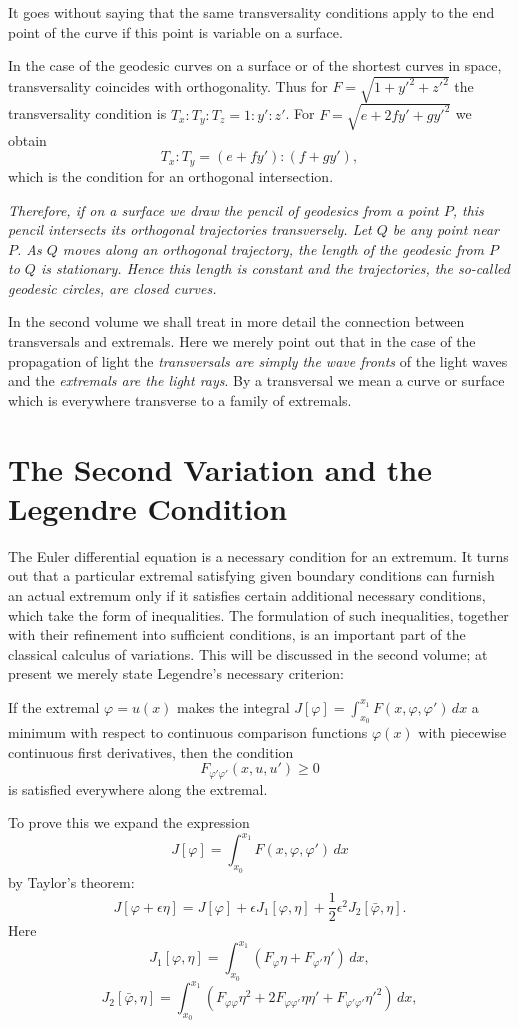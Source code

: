 It goes without saying that the same transversality conditions apply to the end point of the curve if this point is variable on a surface.

In the case of the geodesic curves on a surface or of the shortest curves in space, transversality coincides with orthogonality. Thus for $F=\sqrt{1+y'^2+z'^2}$ the transversality condition is $T_x:T_y:T_z=1:y':z'$. For $F=\sqrt{e+2fy'+gy'^2}$ we obtain
\[
T_x:T_y=(e+fy'):(f+gy'),
\]
which is the condition for an orthogonal intersection.

\emph{Therefore, if on a surface we draw the pencil of geodesics from a point $P$, this pencil intersects its orthogonal trajectories transversely. Let $Q$ be any point near $P$. As $Q$ moves along an orthogonal trajectory, the length of the geodesic from $P$ to $Q$ is stationary. Hence this length is constant and the trajectories, the so-called geodesic circles, are closed curves.}

In the second volume we shall treat in more detail the connection between transversals and extremals. Here we merely point out that in the case of the propagation of light the \emph{transversals are simply the wave fronts} of the light waves and the \emph{extremals are the light rays}. By a transversal we mean a curve or surface which is everywhere transverse to a family of extremals.

\section{The Second Variation and the Legendre Condition}
The Euler differential equation is a necessary condition for an extremum. It turns out that a particular extremal satisfying given boundary conditions can furnish an actual extremum only if it satisfies certain additional necessary conditions, which take the form of inequalities. The formulation of such inequalities, together with their refinement into sufficient conditions, is an important part of the classical calculus of variations. This will be discussed in the second volume; at present we merely state Legendre's necessary criterion:

If the extremal $\varphi=u(x)$ makes the integral $J[\varphi]=\int_{x_0}^{x_1}F(x,\varphi,\varphi')\,dx$ a minimum with respect to continuous comparison functions $\varphi(x)$ with piecewise continuous first derivatives, then the condition
\[
F_{\varphi'\varphi'}(x,u,u')\ge0
\]
is satisfied everywhere along the extremal.

To prove this we expand the expression
\[
J[\varphi]=\int_{x_0}^{x_1}F(x,\varphi,\varphi')\,dx
\]
by Taylor's theorem:
\[
J[\varphi+\epsilon\eta]
=J[\varphi]+\epsilon J_1[\varphi,\eta]+\frac12\epsilon^2J_2[\bar\varphi,\eta].
\]
Here
\[
J_1[\varphi,\eta]=\int_{x_0}^{x_1}(F_\varphi\eta+F_{\varphi'}\eta')\,dx,
\]
\[
J_2[\bar\varphi,\eta]=\int_{x_0}^{x_1}
(F_{\varphi\varphi}\eta^2+2F_{\varphi\varphi'}\eta\eta'
+F_{\varphi'\varphi'}\eta'^2)\,dx,
\]

